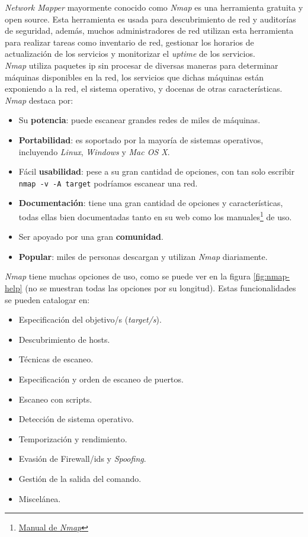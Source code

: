 \textit{Network Mapper} mayormente conocido como \textit{Nmap}\cite{nmap} es una herramienta gratuita y open source. Esta herramienta es usada para descubrimiento de red y auditorías de seguridad, además, muchos administradores de red utilizan esta herramienta para realizar tareas como inventario de red, gestionar los horarios de actualización de los servicios y monitorizar el \textit{uptime} de los servicios.\\

\textit{Nmap} utiliza paquetes \acrshort{ip} sin procesar de diversas maneras para determinar máquinas disponibles en la red, los servicios que dichas máquinas están exponiendo a la red, el sistema operativo, y docenas de otras características.\\

\textit{Nmap} destaca por:

\begin{itemize}
    \item Su \textbf{potencia}: puede escanear grandes redes de miles de máquinas.
    \item \textbf{Portabilidad}: es soportado por la mayoría de sistemas operativos, incluyendo \textit{Linux}, \textit{Windows} y \textit{Mac OS X}.
    \item Fácil \textbf{usabilidad}: pese a su gran cantidad de opciones, con tan solo escribir \texttt{nmap -v -A target} podríamos escanear una red.
    \item \textbf{Documentación}: tiene una gran cantidad de opciones y características, todas ellas bien documentadas tanto en su web como los manuales\footnote{\href{https://linux.die.net/man/1/nmap}{Manual de \textit{Nmap}}} de uso.
    \item Ser apoyado por una gran \textbf{comunidad}.
    \item \textbf{Popular}: miles de personas descargan y utilizan \textit{Nmap} diariamente.
\end{itemize}

\textit{Nmap} tiene muchas opciones de uso, como se puede ver en la figura \ref{fig:nmap-help} (no se muestran todas las opciones por su longitud). Estas funcionalidades se pueden catalogar en:

\begin{itemize}
    \item Especificación del objetivo/s (\textit{target/s}).
    \item Descubrimiento de hosts.
    \item Técnicas de escaneo.
    \item Especificación y orden de escaneo de puertos.
    \item Escaneo con scripts.
    \item Detección de sistema operativo.
    \item Temporización y rendimiento.
    \item Evasión de Firewall/\acrshort{ids} y \textit{Spoofing}.
    \item Gestión de la salida del comando.
    \item Miscelánea.
\end{itemize}

